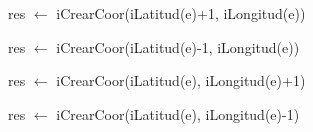 
\begin{algorithm}[H]
	\SetAlgoLined
	\NoCaptionOfAlgo
	\caption{}
	res $\leftarrow$ iCrearCoor(iLatitud(e)+1, iLongitud(e))\; 
\end{algorithm}

\begin{algorithm}[H]
	\SetAlgoLined
	\NoCaptionOfAlgo
	\caption{}
	res $\leftarrow$ iCrearCoor(iLatitud(e)-1, iLongitud(e))\; 
\end{algorithm}

\begin{algorithm}[H]
	\SetAlgoLined
	\NoCaptionOfAlgo
	\caption{}
	res $\leftarrow$ iCrearCoor(iLatitud(e), iLongitud(e)+1)\; 
\end{algorithm}

\begin{algorithm}[H]
	\SetAlgoLined
	\NoCaptionOfAlgo
	\caption{}
	res $\leftarrow$ iCrearCoor(iLatitud(e), iLongitud(e)-1)\; 
\end{algorithm}
